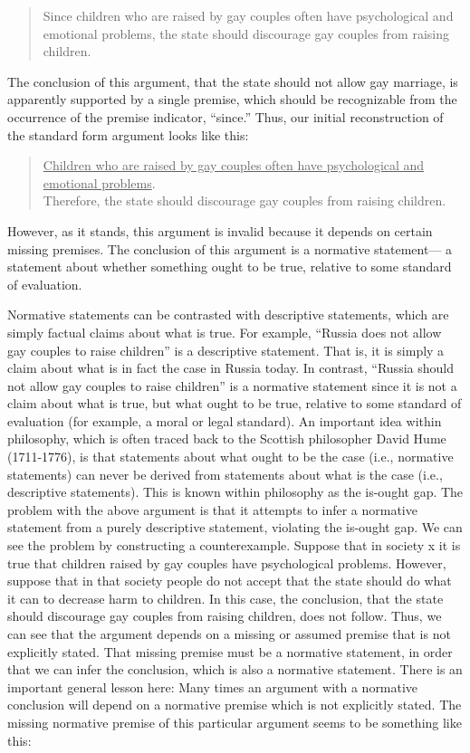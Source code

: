 \begin{quote}
Since children who are raised by gay couples often have psychological
and emotional problems, the state should discourage gay couples from
raising children.
\end{quote}

The conclusion of this argument, that the state should not allow gay marriage, is
apparently supported by a single premise, which should be recognizable from
the occurrence of the premise indicator, ``since.'' Thus, our initial reconstruction
of the standard form argument looks like this:

\begin{quote}
\underline{Children who are raised by gay couples often have psychological and
emotional problems}. \\
Therefore, the state should discourage gay couples from raising
children. \\
\end{quote}

However, as it stands, this argument is invalid because it depends on certain
missing premises. The conclusion of this argument is a normative statement—
a statement about whether something ought to be true, relative to some
standard of evaluation.

Normative statements can be contrasted with
descriptive statements, which are simply factual claims about what is true. For
example, ``Russia does not allow gay couples to raise children'' is a descriptive
statement. That is, it is simply a claim about what is in fact the case in Russia
today. In contrast, ``Russia should not allow gay couples to raise children'' is a
normative statement since it is not a claim about what is true, but what ought to
be true, relative to some standard of evaluation (for example, a moral or legal
standard). An important idea within philosophy, which is often traced back to
the Scottish philosopher David Hume (1711-1776), is that statements about what
ought to be the case (i.e., normative statements) can never be derived from
statements about what is the case (i.e., descriptive statements). This is known
within philosophy as the is-ought gap. The problem with the above argument
is that it attempts to infer a normative statement from a purely descriptive
statement, violating the is-ought gap. We can see the problem by constructing
a counterexample. Suppose that in society x it is true that children raised by gay
couples have psychological problems. However, suppose that in that society
people do not accept that the state should do what it can to decrease harm to
children. In this case, the conclusion, that the state should discourage gay
couples from raising children, does not follow. Thus, we can see that the
argument depends on a missing or assumed premise that is not explicitly stated.
That missing premise must be a normative statement, in order that we can infer
the conclusion, which is also a normative statement. There is an important
general lesson here: Many times an argument with a normative conclusion will
depend on a normative premise which is not explicitly stated. The missing
normative premise of this particular argument seems to be something like this:

